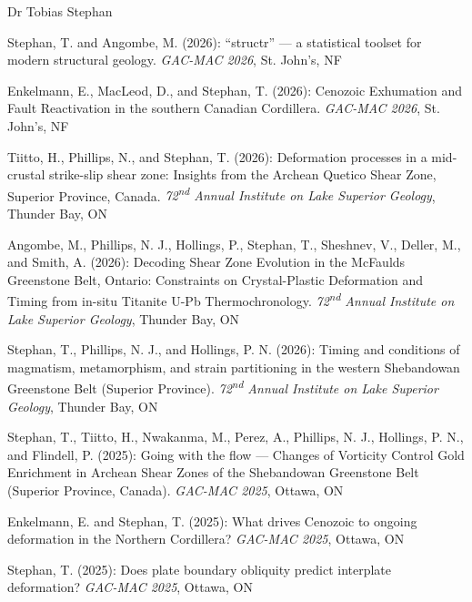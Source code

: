 \documentclass[10pt, paper=letter]{scrartcl} %
\begin{document}
\begin{cv}{\textcolor{myred}{\textsf{Dr Tobias Stephan}}}
    \begingroup
    \setlength{\cvlabelwidth}{1em}
    \begin{cvlist}{} %
        \item[47] Stephan, T. and Angombe, M. (2026): \enquote{structr} --- a statistical toolset for modern structural geology. \textit{GAC-MAC 2026}, St. John's, NF
        \item[46] Enkelmann, E., MacLeod, D., and Stephan, T. (2026): Cenozoic Exhumation and Fault Reactivation in the southern Canadian Cordillera. \textit{GAC-MAC 2026}, St. John's, NF
        \item[45] Tiitto, H., Phillips, N., and Stephan, T. (2026): Deformation processes in a mid-crustal strike-slip shear zone: Insights from the Archean Quetico Shear Zone, Superior Province, Canada. \textit{72\textsuperscript{nd} Annual Institute on Lake Superior Geology}, Thunder Bay, ON
        \item[43] Angombe, M., Phillips, N. J., Hollings, P., Stephan, T., Sheshnev, V., Deller, M., and Smith, A. (2026): Decoding Shear Zone Evolution in the McFaulds Greenstone Belt, Ontario: Constraints on Crystal-Plastic Deformation and Timing from in-situ Titanite U-Pb Thermochronology. \textit{72\textsuperscript{nd} Annual Institute on Lake Superior Geology}, Thunder Bay, ON
        \item[43] Stephan, T., Phillips, N. J., and Hollings, P. N. (2026): Timing and conditions of magmatism, metamorphism, and strain partitioning in the western Shebandowan Greenstone Belt (Superior Province). \textit{72\textsuperscript{nd} Annual Institute on Lake Superior Geology}, Thunder Bay, ON

        \item[42] Stephan, T., Tiitto, H., Nwakanma, M., Perez, A., Phillips, N. J., Hollings, P. N., and Flindell, P. (2025): Going with the flow --- Changes of Vorticity Control Gold Enrichment in Archean Shear Zones of the Shebandowan Greenstone Belt (Superior Province, Canada).  \textit{GAC-MAC 2025},  Ottawa, ON
        \item[41] Enkelmann, E. and Stephan, T. (2025): What drives Cenozoic to ongoing deformation in the Northern Cordillera? \textit{GAC-MAC 2025},  Ottawa, ON
        \item[40] Stephan, T. (2025): Does plate boundary obliquity predict interplate deformation? \textit{GAC-MAC 2025},  Ottawa, ON


\end{cvlist}
\end{cv}
\end{document}
